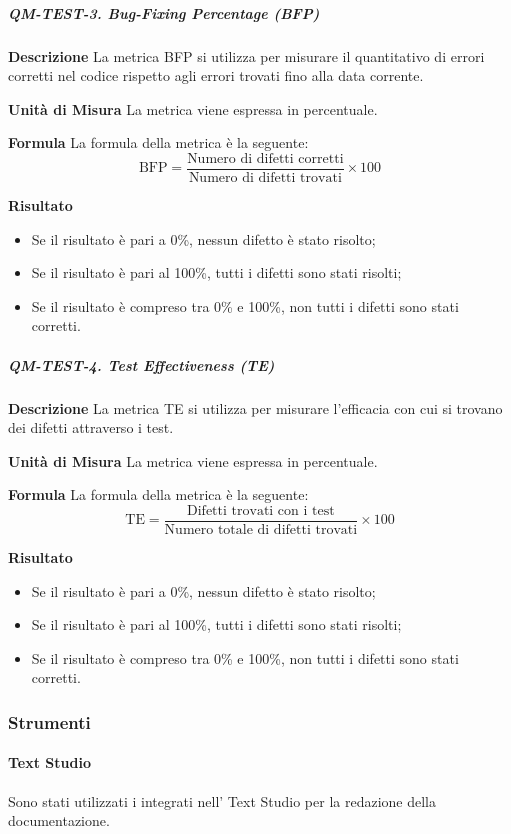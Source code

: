             \subparagraph{QM-TEST-3. Bug-Fixing Percentage (BFP)}

                \textbf{Descrizione}
                La metrica BFP si utilizza per misurare il quantitativo di errori corretti nel codice rispetto agli errori trovati fino alla data corrente.

                \textbf{Unità di Misura}
                La metrica viene espressa in percentuale.

                \textbf{Formula}
                La formula della metrica è la seguente:
                \[
                    \text{BFP} = \frac{\text{Numero di difetti corretti}}{\text{Numero di difetti trovati}} \times 100
                \]

                \textbf{Risultato}
                \begin{itemize}
                    \item Se il risultato è pari a 0\%, nessun difetto è stato risolto;
                    \item Se il risultato è pari al 100\%, tutti i difetti sono stati risolti;
                    \item Se il risultato è compreso tra 0\% e 100\%, non tutti i difetti sono stati corretti.
                \end{itemize}

            \subparagraph{QM-TEST-4. Test Effectiveness (TE)}

                \textbf{Descrizione}
                La metrica TE si utilizza per misurare l'efficacia con cui si trovano dei difetti attraverso i test.

                \textbf{Unità di Misura}
                La metrica viene espressa in percentuale.

                \textbf{Formula}
                La formula della metrica è la seguente:
                \[
                    \text{TE} = \frac{\text{Difetti trovati con i test}}{\text{Numero totale di difetti trovati}} \times 100
                \]

                \textbf{Risultato}
                \begin{itemize}
                    \item Se il risultato è pari a 0\%, nessun difetto è stato risolto;
                    \item Se il risultato è pari al 100\%, tutti i difetti sono stati risolti;
                    \item Se il risultato è compreso tra 0\% e 100\%, non tutti i difetti sono stati corretti.
                \end{itemize}            
        \subsubsection{Strumenti}
            \paragraph{Text Studio}
            	Sono stati utilizzati i  integrati nell' Text Studio per la redazione della documentazione.
